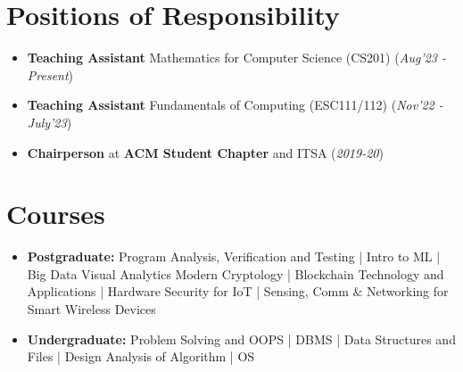 \documentclass[10.8pt, a4paper]{extarticle}
\newcommand{\shorterSection}[1]{\vspace{-10pt}\section{#1}}
\begin{document}
\shorterSection{Positions of Responsibility}
\vspace{-2pt}
\begin{itemize}
    \item \textbf{Teaching Assistant} Mathematics for Computer Science (CS201) \hfill\hfill(\textit{Aug'23 - Present})
    \item \textbf{Teaching Assistant} Fundamentals of Computing (ESC111/112) \hfill\hfill(\textit{Nov'22 - July'23})
    \item \textbf{Chairperson} at \textbf{ACM Student Chapter} and ITSA \hfill\hfill(\textit{2019-20})
\end{itemize}

\shorterSection{Courses}
\vspace{-2pt}
\begin{itemize}
  \item \textbf{Postgraduate:}
    Program Analysis, Verification and Testing |
    Intro to ML |
    Big Data Visual Analytics
    Modern Cryptology |
    Blockchain Technology and Applications |
    Hardware Security for IoT |
    Sensing, Comm $\&$ Networking for Smart Wireless Devices
  \item \textbf{Undergraduate:}
    Problem Solving and OOPS |
    DBMS |
    Data Structures and Files |
    Design Analysis of Algorithm |
    OS
\end{itemize}
\end{document}
